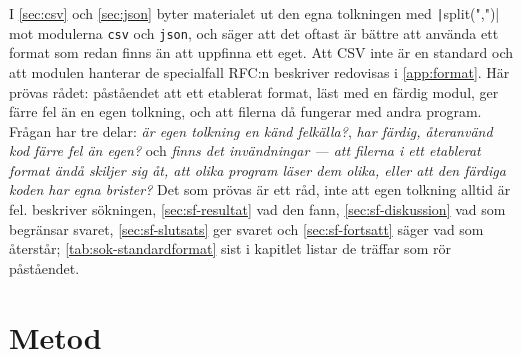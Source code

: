 I \cref{sec:csv} och \cref{sec:json} byter materialet ut den egna
tolkningen med \texttt|split(",")| mot modulerna
\texttt{csv} och \texttt{json}, och säger att det
oftast är bättre att använda ett format som redan finns än att uppfinna
ett eget.  Att CSV inte är en standard och att modulen hanterar de
specialfall RFC:n beskriver redovisas i \cref{app:format}.  Här prövas
rådet: påståendet att ett etablerat format, läst med en färdig modul,
ger färre fel än en egen tolkning, och att filerna då fungerar med andra
program.  Frågan har tre delar: \emph{är egen tolkning en känd
felkälla?}, \emph{har färdig, återanvänd kod färre fel än egen?} och
\emph{finns det invändningar --- att filerna i ett etablerat format ändå
skiljer sig åt, att olika program läser dem olika, eller att den färdiga
koden har egna brister?}  Det som prövas är ett råd, inte att egen
tolkning alltid är fel.   beskriver sökningen,
\cref{sec:sf-resultat} vad den fann, \cref{sec:sf-diskussion} vad som
begränsar svaret, \cref{sec:sf-slutsats} ger svaret och
\cref{sec:sf-fortsatt} säger vad som återstår; \cref{tab:sok-standardformat}
sist i kapitlet listar de träffar som rör påståendet.

\section{Metod}
\label{sec:sf-metod}

